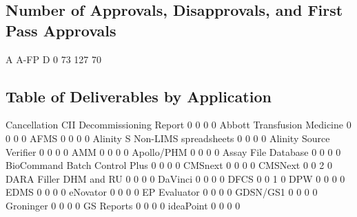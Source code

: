 \documentclass{article}
\begin{document}
\subsection{Number of Approvals, Disapprovals, and First Pass Approvals}

\begin{Schunk}
\begin{Soutput}
        A A-FP    D 
   0   73  127   70 
\end{Soutput}
\end{Schunk}

\subsection{Table of Deliverables by Application}
\begin{Schunk}
\begin{Soutput}
                                     Cancellation CII Decommissioning Report
                                   0            0   0                      0
  Abbott Transfusion Medicine      0            0   0                      0
  AFMS                             0            0   0                      0
  Alinity S Non-LIMS spreadsheets  0            0   0                      0
  Alinity Source Verifier          0            0   0                      0
  AMM                              0            0   0                      0
  Apollo/PHM                       0            0   0                      0
  Assay File Database              0            0   0                      0
  BioCommand Batch Control Plus    0            0   0                      0
  CMSnext                          0            0   0                      0
  CMSNext                          0            0   2                      0
  DARA Filler DHM and RU           0            0   0                      0
  DaVinci                          0            0   0                      0
  DFCS                             0            0   1                      0
  DPW                              0            0   0                      0
  EDMS                             0            0   0                      0
  eNovator                         0            0   0                      0
  EP Evaluator                     0            0   0                      0
  GDSN/GS1                         0            0   0                      0
  Groninger                        0            0   0                      0
  GS Reports                       0            0   0                      0
  ideaPoint                        0            0   0                      0

\end{Soutput}
\end{Schunk}
\end{document}
